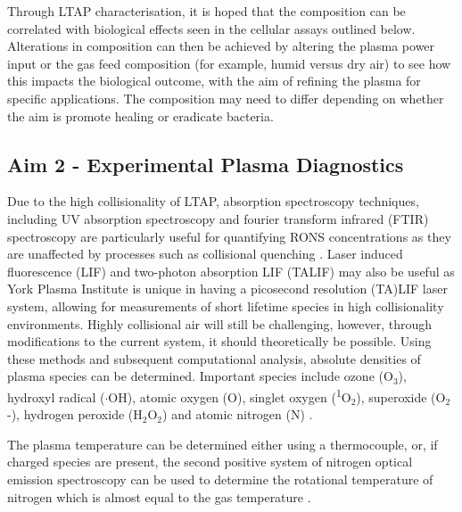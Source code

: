 \documentclass[11pt, oneside]{article}   	%
\begin{document}
Through LTAP characterisation, it is hoped that the composition can be correlated with biological effects seen in the cellular assays outlined below.
Alterations in composition can then be achieved by altering the plasma power input or the gas feed composition (for example, humid versus dry air) to see how this impacts the biological outcome, with the aim of refining the plasma for specific applications. The composition may need to differ depending on whether the aim is promote healing or eradicate bacteria. 


\subsection*{Aim 2 - Experimental Plasma Diagnostics}

Due to the high collisionality of LTAP, absorption spectroscopy techniques, including UV absorption spectroscopy and fourier transform infrared (FTIR) spectroscopy are particularly useful for quantifying RONS concentrations as they are unaffected by processes such as collisional quenching \cite{Niemi2013absolute, Schroter2015atomic}.
Laser induced fluorescence (LIF) and two-photon absorption LIF (TALIF) may also be useful as York Plasma Institute is unique in having a picosecond resolution (TA)LIF laser system, allowing for measurements of short lifetime species in high collisionality environments.
Highly collisional air will still be challenging, however, through modifications to the current system, it should theoretically be possible.
Using these methods and subsequent computational analysis, absolute densities of plasma species can be determined.
Important species include ozone (O$_3$),  hydroxyl radical ($\cdot$OH), atomic oxygen (O), singlet oxygen (\textsuperscript{1}O$_2$), superoxide (O$_2$-), hydrogen peroxide (H$_2$O$_2$) and atomic nitrogen (N) \cite{Graves2014low}.

The plasma temperature can be determined either using a thermocouple, or, if charged species are present, the second positive system of nitrogen optical emission spectroscopy can be used to determine the rotational temperature of nitrogen which is almost equal to the gas temperature \cite{Twomey2011correlation}.

\end{document}

